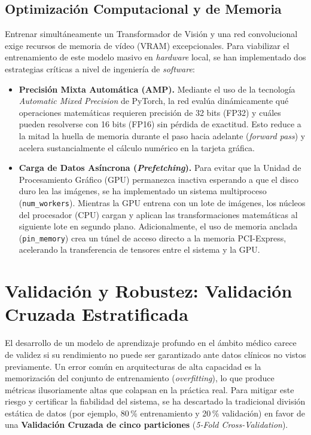 \subsection{Optimización Computacional y de Memoria}

Entrenar simultáneamente un Transformador de Visión y una red convolucional exige recursos de memoria de vídeo (VRAM) excepcionales. Para viabilizar el entrenamiento de este modelo masivo en \textit{hardware} local, se han implementado dos estrategias críticas a nivel de ingeniería de \textit{software}:

\begin{itemize}
	\item \textbf{Precisión Mixta Automática (AMP).} Mediante el uso de la tecnología \textit{Automatic Mixed Precision} de PyTorch, la red evalúa dinámicamente qué operaciones matemáticas requieren precisión de 32 bits (FP32) y cuáles pueden resolverse con 16 bits (FP16) sin pérdida de exactitud. Esto reduce a la mitad la huella de memoria durante el paso hacia adelante (\textit{forward pass}) y acelera sustancialmente el cálculo numérico en la tarjeta gráfica.
	
	\item \textbf{Carga de Datos Asíncrona (\textit{Prefetching}).} Para evitar que la Unidad de Procesamiento Gráfico (GPU) permanezca inactiva esperando a que el disco duro lea las imágenes, se ha implementado un sistema multiproceso (\texttt{num\_workers}). Mientras la GPU entrena con un lote de imágenes, los núcleos del procesador (CPU) cargan y aplican las transformaciones matemáticas al siguiente lote en segundo plano. Adicionalmente, el uso de memoria anclada (\texttt{pin\_memory}) crea un túnel de acceso directo a la memoria PCI-Express, acelerando la transferencia de tensores entre el sistema y la GPU.
\end{itemize}

\section{Validación y Robustez: Validación Cruzada Estratificada}

El desarrollo de un modelo de aprendizaje profundo en el ámbito médico carece de validez si su rendimiento no puede ser garantizado ante datos clínicos no vistos previamente. Un error común en arquitecturas de alta capacidad es la memorización del conjunto de entrenamiento (\textit{overfitting}), lo que produce métricas ilusoriamente altas que colapsan en la práctica real. Para mitigar este riesgo y certificar la fiabilidad del sistema, se ha descartado la tradicional división estática de datos (por ejemplo, 80\,\% entrenamiento y 20\,\% validación) en favor de una \textbf{Validación Cruzada de cinco particiones} (\textit{5-Fold Cross-Validation}). 

